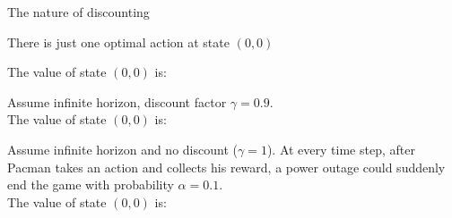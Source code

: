 \begin{problem}[]{The nature of discounting}
\begin{question}
{
\renewcommand\truefalsepoints{2}
\begin{truefalse}
There is just one optimal action at state $(0,0)$
\end{truefalse}}
\solution{}{\OneCi}

\begin{subquestion}[2]
The value of state $(0,0)$ is: \underline{\hspace{1cm}\solution{}{\OneCii}\hspace{1cm}}  
\end{subquestion}


\end{question}

\begin{question}[4]
Assume infinite horizon, discount factor $\gamma = 0.9$. 
\\

The value of state $(0,0)$ is: \underline{\hspace{1cm}\solution{}{\OneD \\}\hspace{1cm}}  \hfill \hfill
\\

\end{question}


\begin{question}[4]
Assume infinite horizon and no discount ($\gamma = 1$). At every time step, after Pacman takes an action and collects his reward, a power outage could suddenly end the game with probability $\alpha= 0.1$. \\

The value of state $(0,0)$ is: \underline{\hspace{1cm}\solution{}{\OneE}\hspace{1cm}}  \hfill \hfill
\\

\end{question}
%
\end{problem}

